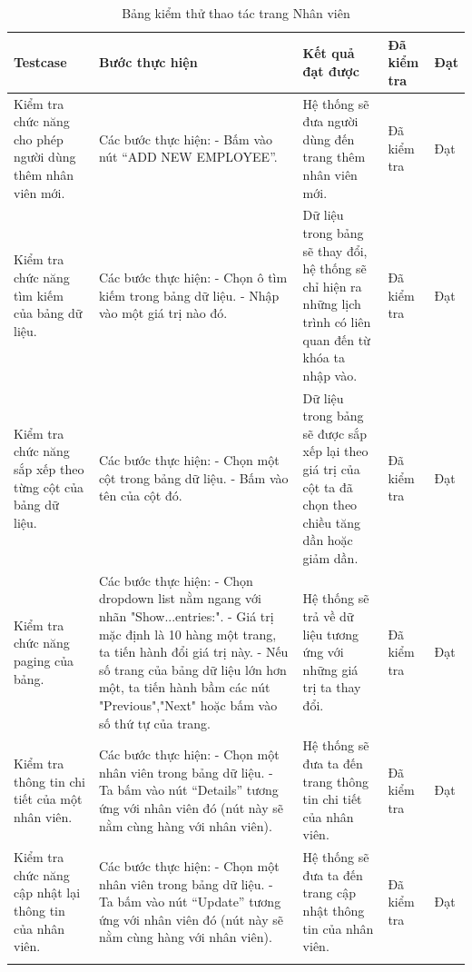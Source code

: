 \documentclass[a4paper]{article}
\begin{document}
\begin{longtable}{ | p{} |p{} | p{}  | p{}  | p{}  | } 
\hline
\textbf{Testcase}& \textbf{Bước thực hiện}& \textbf{Kết quả đạt được} & \textbf{Đã kiểm tra}& \textbf{Đạt} \\ 
\hline
\hline
Kiểm tra chức năng cho phép người dùng thêm nhân viên mới. &
Các bước thực hiện: \newline
- Bấm vào nút “ADD NEW EMPLOYEE”. 
&
Hệ thống sẽ đưa người dùng đến trang thêm nhân viên mới. &
Đã kiểm tra &
Đạt \\

\hline
Kiểm tra chức năng tìm kiếm của bảng dữ liệu. &
Các bước thực hiện: \newline
- Chọn ô tìm kiếm trong bảng dữ liệu. \newline
- Nhập vào một giá trị nào đó. 
&
Dữ liệu trong bảng sẽ thay đổi, hệ thống sẽ chỉ hiện ra những lịch trình có liên quan đến từ khóa ta nhập vào. &
Đã kiểm tra &
Đạt \\

\hline
Kiểm tra chức năng sắp xếp theo từng cột của bảng dữ liệu. &
Các bước thực hiện: \newline
- Chọn một cột trong bảng dữ liệu.  \newline
- Bấm vào tên của cột đó. 
&
Dữ liệu trong bảng sẽ được sắp xếp lại theo giá trị của cột ta đã chọn theo chiều tăng dần hoặc giảm dần. &
Đã kiểm tra &
Đạt \\

\hline
Kiểm tra chức năng paging của bảng. &
Các bước thực hiện: \newline
- Chọn dropdown list nằm ngang với nhãn "Show...entries:".  \newline
- Giá trị mặc định là 10 hàng một trang, ta tiến hành đổi giá trị này. \newline
- Nếu số trang của bảng dữ liệu lớn hơn một, ta tiến hành bầm các nút "Previous","Next" hoặc bấm vào số thứ tự của trang. 
&
Hệ thống sẽ trả về dữ liệu tương ứng với những giá trị ta thay đổi. &
Đã kiểm tra &
Đạt \\

\hline
Kiểm tra thông tin chi tiết của một nhân viên. &
Các bước thực hiện: \newline
- Chọn một nhân viên trong bảng dữ liệu.   \newline
- Ta bấm vào nút “Details” tương ứng với nhân viên đó (nút này sẽ nằm cùng hàng với nhân viên). 
&
Hệ thống sẽ đưa ta đến trang thông tin chi tiết của nhân viên. &
Đã kiểm tra &
Đạt \\

\hline
Kiểm tra chức năng cập nhật lại thông tin của nhân viên. &
Các bước thực hiện: \newline
- Chọn một nhân viên trong bảng dữ liệu.    \newline
- Ta bấm vào nút “Update” tương ứng với nhân viên đó (nút này sẽ nằm cùng hàng với nhân viên). 
&
Hệ thống sẽ đưa ta đến trang cập nhật thông tin của nhân viên. &
Đã kiểm tra &
Đạt \\

\hline
\caption{Bảng kiểm thử thao tác trang Nhân viên}
\end{longtable}
\end{document}
